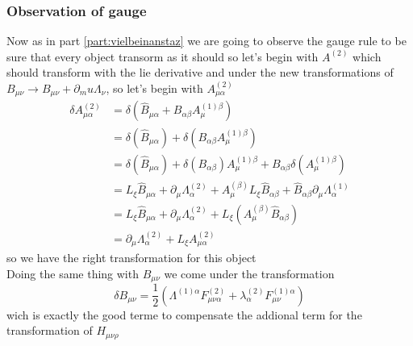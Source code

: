 \documentclass{article}
\begin{document}
\subsubsection{Observation of gauge} 
Now as in part \ref{part:vielbeinanstaz} we are going to observe the gauge rule to be sure that every object transorm as it should
so let's begin with $A^{(2)}$ which should transform with the lie derivative and under the new transformations of $B_{\mu \nu} \rightarrow B_{\mu \nu} + \partial_mu \Lambda_\nu$, so let's begin
with $A^{(2)}_{\mu \alpha}$
\begin{equation}
    \begin{aligned}
        \delta A^{(2)}_{\mu \alpha}&= \delta(\hat B_{\mu \alpha}+ B_{\alpha\beta}A^{(1)\beta}_\mu)\\
        &=\delta(\hat B_{\mu \alpha})+ \delta(B_{\alpha\beta}A^{(1)\beta}_\mu)\\
        &= \delta(\hat B_{\mu \alpha})+ \delta(B_{\alpha\beta})A^{(1)\beta}_\mu+ B_{\alpha\beta}\delta(A^{(1)\beta}_\mu)\\
        &= L_{\xi} \hat B_{\mu \alpha} + \partial_\mu \Lambda^{(2)}_{\alpha}+A^{(\beta)}_\mu L_{\xi} \hat B_{ \alpha \beta } +\hat B_{ \alpha \beta } \partial_\mu \Lambda^{(1)}_\alpha\\
        &= L_{\xi} \hat B_{\mu \alpha} + \partial_\mu \Lambda^{(2)}_{\alpha}+L_{\xi} (A^{(\beta)}_\mu \hat B_{ \alpha \beta })\\
        &=\partial_\mu \Lambda^{(2)}_{\alpha} +L_\xi A^{(2)}_{\mu \alpha}
    \end{aligned}
\end{equation}
so we have the right transformation for this object\\
Doing the same thing with $B_{\mu \nu}$ we come under the transformation 
\begin{equation}
    \delta B_{\mu \nu} = \frac{1}{2}(\Lambda^{(1)\alpha}F^{(2)}_{\mu \nu \alpha} + \lambda^{(2)}_{\alpha}F^{(1)\alpha}_{\mu \nu})
\end{equation}
wich is exactly the good terme to compensate the addional term for the transformation of $H_{\mu \nu \rho}$
\end{document}
